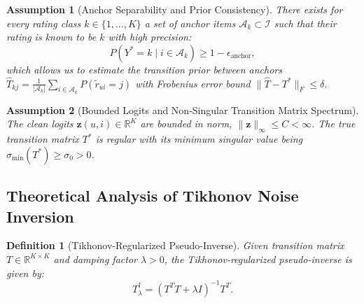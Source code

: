 \documentclass[10pt,journal]{IEEEtran}
\newtheorem{definition}{Definition}
\newtheorem{assumption}{Assumption}
\begin{document}
\begin{assumption}[Anchor Separability and Prior Consistency]
\label{ass:anchor}
There exists for every rating class $k \in \{1, \dots, K\}$ a set of anchor items $\mathcal{A}_k \subset \mathcal{I}$ such that their rating is known to be $k$ with high precision:
\begin{equation}
    P(Y^* = k \mid i \in \mathcal{A}_k) \ge 1 - \epsilon_{\mathrm{anchor}},
\end{equation}
which allows us to estimate the transition prior between anchors $\hat{T}_{kj} = \frac{1}{|\mathcal{A}_k|} \sum_{i \in \mathcal{A}_k} P(\tilde{r}_{ui} = j)$ with Frobenius error bound $\|\hat{T} - T^*\|_F \le \delta$.
\end{assumption}

\begin{assumption}[Bounded Logits and Non-Singular Transition Matrix Spectrum]
\label{ass:bounded}
The clean logits $\mathbf{z}(u, i) \in \mathbb{R}^K$ are bounded in norm, $\|\mathbf{z}\|_\infty \le C < \infty$. The true transition matrix $T^*$ is regular with its minimum singular value being $\sigma_{\min}(T^*) \ge \sigma_0 > 0$.
\end{assumption}

\subsection{Theoretical Analysis of Tikhonov Noise Inversion}

\begin{definition}[Tikhonov-Regularized Pseudo-Inverse]
\label{def:tikhonov}
Given transition matrix $T \in \mathbb{R}^{K \times K}$ and damping factor $\lambda > 0$, the Tikhonov-regularized pseudo-inverse is given by:
\begin{equation}
    T^{\dagger}_{\lambda} = (T^T T + \lambda I)^{-1} T^T.
\end{equation}
\end{definition}
\end{document}
